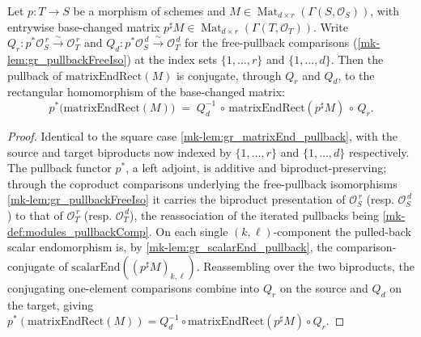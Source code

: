 \begin{lemma}\label{mk-lem:gr_matrixEndRect_pullback}
  \leanok

  Let \(p : T \to S\) be a morphism of schemes and
  \(M \in \operatorname{Mat}_{d\times r}(\Gamma(S,\mathcal{O}_S))\), with entrywise
  base-changed matrix \(p^{\sharp}M \in \operatorname{Mat}_{d\times r}(\Gamma(T,\mathcal{O}_T))\).
  Write \(Q_r : p^{*}\mathcal{O}_S^{\,r} \xrightarrow{\sim} \mathcal{O}_T^{\,r}\) and
  \(Q_d : p^{*}\mathcal{O}_S^{\,d} \xrightarrow{\sim} \mathcal{O}_T^{\,d}\) for the
  free-pullback comparisons (\ref{mk-lem:gr_pullbackFreeIso}) at the index sets
  \(\{1,\dots,r\}\) and \(\{1,\dots,d\}\). Then the pullback of
  \(\mathrm{matrixEndRect}(M)\) is conjugate, through \(Q_r\) and \(Q_d\), to the
  rectangular homomorphism of the base-changed matrix:
  \[
    p^{*}\bigl(\mathrm{matrixEndRect}(M)\bigr)
      \;=\; Q_d^{-1} \,\circ\, \mathrm{matrixEndRect}(p^{\sharp}M) \,\circ\, Q_r .
  \]
\end{lemma}
\begin{proof}
  Identical to the square case \ref{mk-lem:gr_matrixEnd_pullback}, with the source and target
  biproducts now indexed by \(\{1,\dots,r\}\) and \(\{1,\dots,d\}\) respectively. The
  pullback functor \(p^{*}\), a left adjoint, is additive and biproduct-preserving; through
  the coproduct comparisons underlying the free-pullback isomorphisms
  \ref{mk-lem:gr_pullbackFreeIso} it carries the biproduct presentation of
  \(\mathcal{O}_S^{\,r}\) (resp. \(\mathcal{O}_S^{\,d}\)) to that of \(\mathcal{O}_T^{\,r}\)
  (resp. \(\mathcal{O}_T^{\,d}\)), the reassociation of the iterated pullbacks being
  \ref{mk-def:modules_pullbackComp}. On each single \((k,\ell)\)-component the pulled-back
  scalar endomorphism is, by \ref{mk-lem:gr_scalarEnd_pullback}, the comparison-conjugate of
  \(\mathrm{scalarEnd}((p^{\sharp}M)_{k,\ell})\). Reassembling over the two biproducts, the
  conjugating one-element comparisons combine into \(Q_r\) on the source and \(Q_d\) on the
  target, giving \(p^{*}(\mathrm{matrixEndRect}(M)) = Q_d^{-1}\circ
  \mathrm{matrixEndRect}(p^{\sharp}M)\circ Q_r\).
\end{proof}

